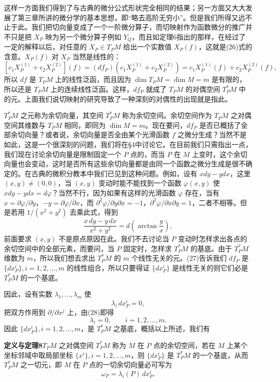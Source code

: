 这样一方面我们得到了与古典的微分公式形状完全相同的结果；另一方面又大大发展了第三章所讲的微分学的基本思想，即“略去高阶无穷小”。但是我们所得又远不止于此。我们把切向量变成了一个一阶微分算子，而切映射作为函数微分的推广并不只是把 $X_P$ 映为另一个微分算子例如 $Y_Q$，而且如定理6指出的那样，在经过了一定的解释以后，对任意的 $X_P\in T_PM$ 给出一个实数值 $X_P(f)$，这就是(26)式的含意。$X_P(f)$ 对 $X_P$ 当然是线性的：
\[
 [c_1X_P^{(1)}+c_2X_P^{(2)}](f)
 =(df_P)(c_1X_P^{(1)}+c_2X_P^{(2)})
 =c_1X_P^{(1)}(f)+c_2X_P^{(2)}(f),
\]
所以 $df$ 是 $T_PM$ 上的线性泛函，而且因为 $\dim T_PM=\dim M=m$ 是有限的，所以还是 $T_PM$ 上的连续线性泛函。这样，$df_P$ 就成了 $T_PM$ 的对偶空间 $T_P^*M$ 中的元。上面我们说切映射的研究导致了一种深刻的对偶性的出现就是指此。

$T_P^*M$ 之元称为余切向量，其空间 $T_P^*M$ 称为余切空间。余切空间作为 $T_PM$ 之对偶空间其维数与 $T_PM$ 相同，即同为 $\dim M=m$。现在要问，$df_P$ 是否已概括了全部余切向量？或者说，余切向量是否全由某个光滑函数 $f$ 之微分生成？当然不是如此，这是一个很深刻的问题，我们将在§4中讨论它。在目前我们只需指出一点，我们现在讨论余切向量是限制固定一个 $P$ 点的，而当 $P$ 在 $M$ 上变时，这个余切向量也会变动，这时是否所有这些余切向量都是由同一个函数之微分生成是很不确定的。在古典的微积分教本中我们已见到这种问题。例如，设有 $xdy-ydx$，这里 $(x,y)\ne(0,0)$，当 $(x,y)$ 变动时能不能找到一个函数 $\varphi(x,y)$ 使 $xdy-ydx=d\varphi$？当然不行，因为如果有这样的光滑函数 $\varphi$ 存在，当有 $x=\partial\varphi/\partial y$，$-y=\partial\varphi/\partial x$，而 $\partial^2\varphi/\partial y\partial x=-1$，$\partial^2\varphi/\partial x\partial y=1$，二者不相等。但是若用 $1/(x^2+y^2)$ 去乘此式，得到
\[
 \frac{x\,dy-y\,dx}{x^2+y^2}=d\left(\arctan\frac{y}{x}\right),
\]
前面要求 $(x,y)$ 不是原点原因在此。我们不去讨论当 $P$ 变动时怎样求出各点的余切空间中的全部元素，而要问，当 $P$ 固定时，怎样求 $T_P^*M$ 的基底。由于 $T_P^*M$ 维数为 $m$，所以我们想去求出 $T_P^*M$ 的 $m$ 个线性无关的元。(27)告诉我们 $df_P$ 是 $\{dx_P^i\},i=1,2,\ldots,m$ 的线性组合，所以只要得证 $\{dx_P^i\}$ 是线性无关的则它们必是 $T_P^*M$ 的一个基底。

因此，设有实数 $\lambda_1,\ldots,\lambda_m$ 使
\[
 \lambda_i\,dx_P^i=0,
\]
把双方作用到 $\partial/\partial x^j$ 上，由(28)即得
\[
 \lambda_i=0,\qquad i=1,2,\ldots,m.
\]
因此 $\{dx_P^i\},i=1,2,\ldots,m$，是 $T_P^*M$ 之基底，概括以上所述，我们有

\noindent\textbf{定义与定理8}\quad $T_PM$ 之对偶空间 $T_P^*M$ 称为 $M$ 在 $P$ 点的余切空间，若在 $M$ 上某个坐标邻域中取局部坐标 $\{x^i\},i=1,2,\ldots,m$，则 $\{dx_P^i\}$ 是 $T_P^*M$ 的一个基底，从而 $T_P^*M$ 之一切元，即 $M$ 在 $P$ 点的一切余切向量必可写为
\begin{equation}
 \omega_P=\lambda_i(P)\,dx_P^i.
 \tag{29}
\end{equation}

